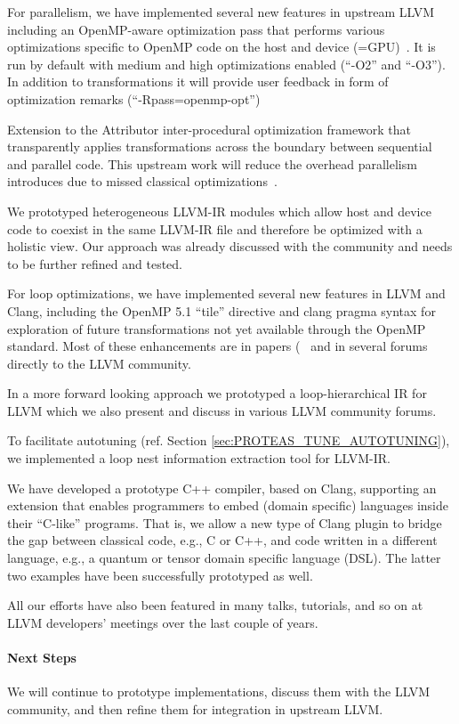 For parallelism, we have implemented several new features in upstream LLVM
including an OpenMP-aware optimization pass that performs various optimizations
specific to OpenMP code on the host and device (=GPU)~\cite{OpenMPOpt2020}. It
is run by default with medium and high optimizations enabled (``-O2'' and
``-O3''). In addition to transformations it will provide user feedback in form
of optimization remarks (``-Rpass=openmp-opt'')

Extension to the Attributor inter-procedural optimization framework that
transparently applies transformations across the  boundary between sequential
and parallel code. This upstream work will reduce the overhead parallelism
introduces due to missed classical optimizations~\cite{giorgis2020}.

We prototyped heterogeneous LLVM-IR modules which allow host and device code to
coexist in the same LLVM-IR file and therefore be optimized with a holistic
view. Our approach was already discussed with the community and needs to be
further refined and tested.

For loop optimizations, we have implemented several new features in LLVM and
Clang, including the OpenMP 5.1 ``tile'' directive and clang pragma syntax for
exploration of future transformations not yet available through the OpenMP
standard. Most of these enhancements are in papers
(~\cite{kruse2018user,kruse2018loop} and in several forums directly to the LLVM
community.

In a more forward looking approach we prototyped a loop-hierarchical IR for
LLVM which we also present and discuss in various LLVM community forums.

To facilitate autotuning (ref. Section \ref{sec:PROTEAS_TUNE_AUTOTUNING}), we
implemented a loop nest information extraction tool for LLVM-IR.

We have developed a prototype C++ compiler, based on Clang, supporting an
extension that enables programmers to embed (domain specific) languages inside
their ``C-like'' programs. That is, we allow a new type of Clang plugin to bridge
the gap between classical code, e.g., C or C++, and code written in a different
language, e.g., a quantum or tensor domain specific language (DSL). The latter
two examples have been successfully prototyped as well.

All our efforts have also been featured in many talks, tutorials, and so on at
LLVM developers' meetings over the last couple of years.

\paragraph{Next Steps}
We will continue to prototype implementations, discuss them with the LLVM
community, and then refine them for integration in upstream LLVM.

